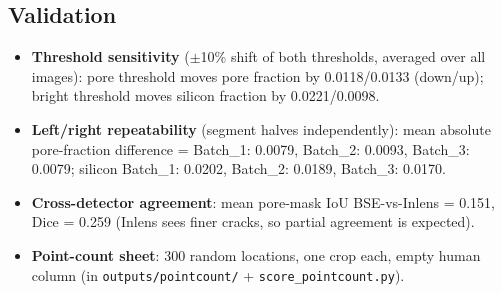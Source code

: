 \documentclass[11pt,a4paper]{article}
\begin{document}
\subsection{Validation}
\begin{itemize}
\item \textbf{Threshold sensitivity}
($\pm$10\% shift of both thresholds, averaged over all images): pore
threshold moves pore fraction by 0.0118/0.0133 (down/up);
bright threshold moves silicon fraction by 0.0221/0.0098.
\item \textbf{Left/right repeatability} (segment halves independently):
mean absolute pore-fraction difference = Batch\_1: 0.0079, Batch\_2: 0.0093, Batch\_3: 0.0079; silicon
Batch\_1: 0.0202, Batch\_2: 0.0189, Batch\_3: 0.0170.
\item \textbf{Cross-detector agreement}: mean pore-mask IoU BSE-vs-Inlens =
0.151, Dice = 0.259 (Inlens sees finer cracks,
so partial agreement is expected).
\item \textbf{Point-count sheet}: 300 random locations, one crop each, empty
human column (in \texttt{outputs/pointcount/} +
\texttt{score\_pointcount.py}).
\end{itemize}
\end{document}
